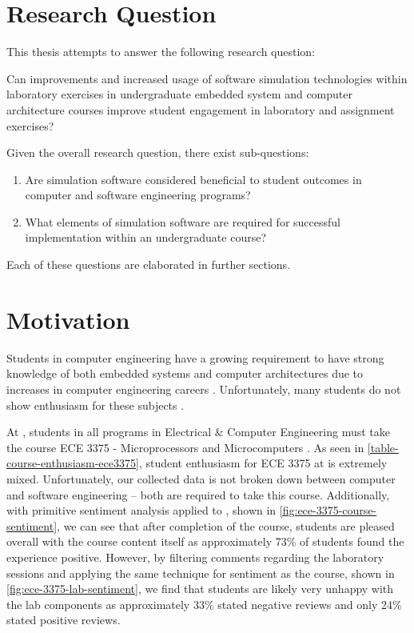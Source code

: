 \section{Research Question}

This thesis attempts to answer the following research question:
\begin{displayquote}
Can improvements and increased usage of software simulation technologies within laboratory exercises in undergraduate embedded system and computer architecture courses improve student engagement in laboratory and assignment exercises?
\end{displayquote}
Given the overall research question, there exist sub-questions: 
\begin{enumerate}
	\item Are simulation software considered beneficial to student outcomes in computer and software engineering programs?
	\item What elements of simulation software are required for successful implementation within an undergraduate course?
\end{enumerate}
Each of these questions are elaborated in further sections. 

\section{Motivation}
\label{sec:motivation}

Students in computer engineering have a growing requirement to have strong knowledge of both embedded systems and computer architectures due to increases in computer engineering careers \cite{cec2016, bls2014}. Unfortunately, many students do not show enthusiasm for these subjects \cite{Ackovska2014,Ackovska2014,Stolikj2011}. 

At \uwo{}, students in all programs in Electrical \& Computer Engineering must take the course ECE 3375 - Microprocessors and Microcomputers \cite{uwo-we-programprogression, eceoutline-ece3375}. As seen in \cref{table-course-enthusiasm-ece3375}, student enthusiasm for ECE 3375 at \uwo{} is extremely mixed. Unfortunately, our collected data is not broken down between computer and software engineering -- both are required to take this course. Additionally, with primitive sentiment analysis applied to \cite{evals:ece3375-2013, evals:ece3375-2014}, shown in \cref{fig:ece-3375-course-sentiment}, we can see that after completion of the course, students are pleased overall with the course content itself as approximately 73\% of students found the experience positive. However, by filtering comments regarding the laboratory sessions and applying the same technique for sentiment as the course, shown in \cref{fig:ece-3375-lab-sentiment}, we find that students are likely very unhappy with the lab components as approximately 33\% stated negative reviews and only 24\% stated positive reviews. 


